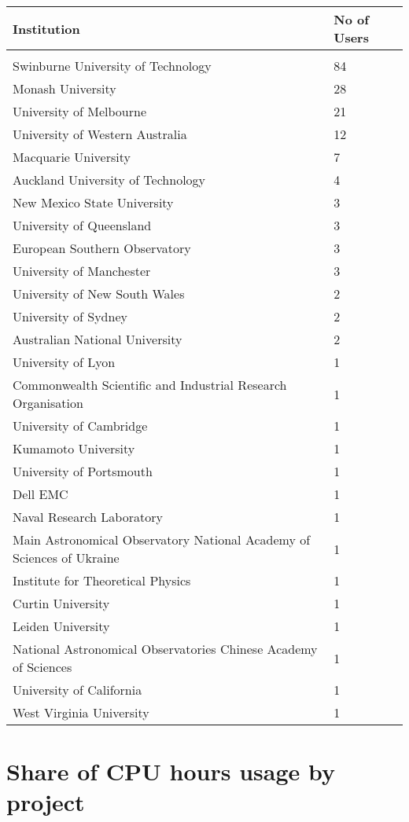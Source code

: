 \documentclass{article}%
\begin{document}
%
\begin{longtabu}{X[l] X[r]}%
\textbf{Institution}&\textbf{No of Users}\\%
\hline%
&\\%
Swinburne University of Technology&84\\%
\hline%
Monash University&28\\%
\hline%
University of Melbourne&21\\%
\hline%
University of Western Australia&12\\%
\hline%
Macquarie University&7\\%
\hline%
Auckland University of Technology&4\\%
\hline%
New Mexico State University&3\\%
\hline%
University of Queensland&3\\%
\hline%
European Southern Observatory&3\\%
\hline%
University of Manchester&3\\%
\hline%
University of New South Wales&2\\%
\hline%
University of Sydney&2\\%
\hline%
Australian National University&2\\%
\hline%
University of Lyon&1\\%
\hline%
Commonwealth Scientific and Industrial Research Organisation&1\\%
\hline%
University of Cambridge&1\\%
\hline%
Kumamoto University&1\\%
\hline%
University of Portsmouth&1\\%
\hline%
Dell EMC&1\\%
\hline%
Naval Research Laboratory&1\\%
\hline%
Main Astronomical Observatory National Academy of Sciences of Ukraine&1\\%
\hline%
Institute for Theoretical Physics&1\\%
\hline%
Curtin University&1\\%
\hline%
Leiden University&1\\%
\hline%
National Astronomical Observatories Chinese Academy of Sciences&1\\%
\hline%
University of California&1\\%
\hline%
West Virginia University&1\\%
\hline%
\end{longtabu}%
\section{Share of CPU hours usage by project}%
\end{document}
